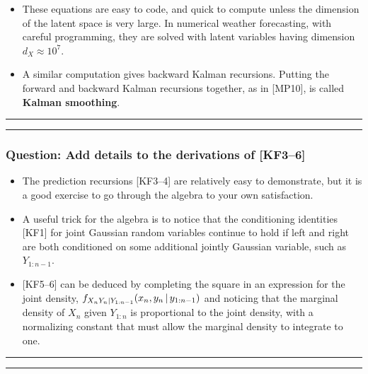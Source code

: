 \documentclass[]{article}
\begin{document}
\begin{itemize}
\item
  These equations are easy to code, and quick to compute unless the
  dimension of the latent space is very large. In numerical weather
  forecasting, with careful programming, they are solved with latent
  variables having dimension \(d_X\approx 10^7\).
\item
  A similar computation gives backward Kalman recursions. Putting the
  forward and backward Kalman recursions together, as in {[}MP10{]}, is
  called \textbf{Kalman smoothing}.
\end{itemize}

\begin{center}\rule{0.5\linewidth}{\linethickness}\end{center}

\begin{center}\rule{0.5\linewidth}{\linethickness}\end{center}

\subsubsection{Question: Add details to the derivations of
{[}KF3--6{]}}\label{question-add-details-to-the-derivations-of-kf36}

\begin{itemize}
\item
  The prediction recursions {[}KF3--4{]} are relatively easy to
  demonstrate, but it is a good exercise to go through the algebra to
  your own satisfaction.
\item
  A useful trick for the algebra is to notice that the conditioning
  identities {[}KF1{]} for joint Gaussian random variables continue to
  hold if left and right are both conditioned on some additional jointly
  Gaussian variable, such as \(Y_{1:n-1}\).
\item
  {[}KF5--6{]} can be deduced by completing the square in an expression
  for the joint density,
  \(f_{X_nY_n|Y_{1:n-1}}(x_n,y_n{\, | \,} y_{1:n-1})\) and noticing that
  the marginal density of \(X_n\) given \(Y_{1:n}\) is proportional to
  the joint density, with a normalizing constant that must allow the
  marginal density to integrate to one.
\end{itemize}

\begin{center}\rule{0.5\linewidth}{\linethickness}\end{center}

\begin{center}\rule{0.5\linewidth}{\linethickness}\end{center}
\end{document}
